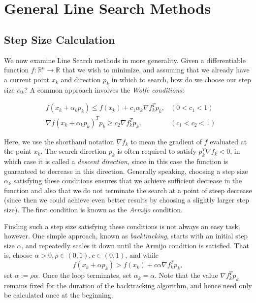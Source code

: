 \section*{General Line Search Methods}
\subsection*{Step Size Calculation}
We now examine Line Search methods in more generality. Given a differentiable function
$f : \mathbb{R}^n \rightarrow \mathbb{R}$ that we wish to minimize, and assuming that
we already have a current point $x_k$ and direction $p_k$ in which to search, how do we 
choose our step size $\alpha_k$? A common approach involves the \emph{Wolfe conditions}:

\begin{align*}
&f(x_k + \alpha_kp_k) \leq f(x_k) + c_1\alpha_k\nabla f_k^Tp_k, &(0 < c_1 < 1)
\\ &\nabla f(x_k + \alpha_kp_k)^Tp_k \geq c_2\nabla f_k^Tp_k, &(c_1 < c_2 < 1)
\end{align*}

Here, we use the shorthand notation $\nabla f_k$ to
mean the gradient of $f$ evaluated at the point $x_k$. The search direction $p_k$ is
often required to satisfy $p_k^T \nabla f_k < 0$, in which case it is called a
\emph{descent direction}, since in this case the function is guaranteed to decrease in
this direction. Generally speaking, choosing a step size $\alpha_k$ satisfying these conditions
ensures that we achieve sufficient decrease in the function and also that we do not
terminate the search at a point of steep decrease (since then we could achieve even
better results by choosing a slightly larger step size). The first condition is known
as the \emph{Armijo} condition. 

Finding such a step size satisfying these conditions is not always an easy task, however.
One simple approach, known as \emph{backtracking}, starts with an initial step size
$\alpha$, and repeatedly scales it down until the Armijo condition is satisfied.
That is, choose $\alpha >0, \rho \in (0, 1), c\in (0, 1)$, and while
$$
f(x_k + \alpha p_k) > f(x_k) + c\alpha\nabla f_k^Tp_k,
$$
set $\alpha := \rho\alpha$. Once the loop terminates, set $\alpha_k = \alpha$. Note that the value
$\nabla f_k^Tp_k$ remains fixed for the duration of the backtracking algorithm, and hence need only 
be calculated once at the beginning.
%

